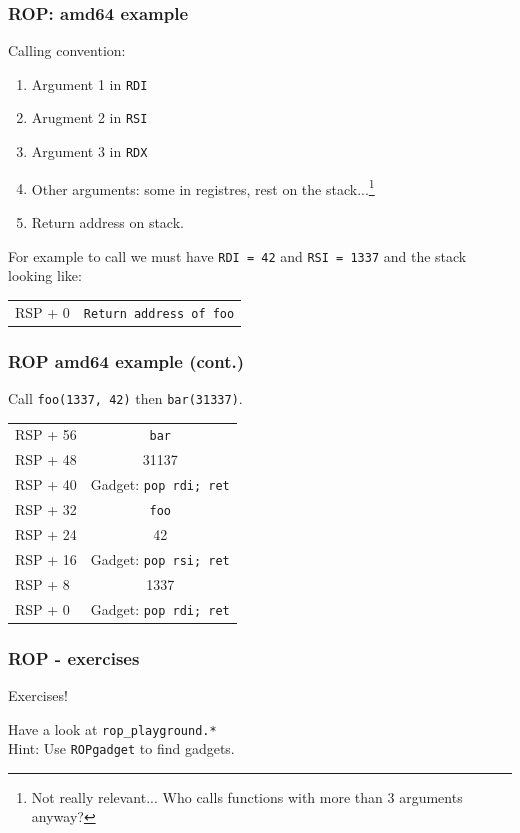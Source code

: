 \documentclass{beamer}
\begin{document}
\begin{frame}
    \frametitle{ROP: amd64 example}
    Calling convention:
    \begin{enumerate}
        \item Argument 1 in \texttt{RDI}
        \item Arugment 2 in \texttt{RSI}
        \item Argument 3 in \texttt{RDX}
        \item Other arguments: some in registres, rest on the stack...\footnote{Not really relevant... Who calls functions with more than 3 arguments anyway?}
        \item Return address on stack.
    \end{enumerate}
    \pause For example to call 
    \pause we must have \texttt{RDI = 42}
    \pause and \texttt{RSI = 1337}
    \pause and the stack looking like:
    \begin{center}
    \begin{tabular}{l|c}
        RSP + 0  & \texttt{Return address of foo}
    \end{tabular}
    \end{center}
\end{frame}


\begin{frame}
    \frametitle{ROP amd64 example (cont.)}
    Call \texttt{foo(1337, 42)} then \texttt{bar(31337)}.
    \begin{center}
    \begin{tabular}{l|c}
        RSP + 56 & \texttt{bar} \\
        RSP + 48 & 31137 \\
        RSP + 40 & Gadget: \texttt{pop rdi; ret} \\
        RSP + 32 & \texttt{foo} \\
        RSP + 24 & 42 \\
        RSP + 16 & Gadget: \texttt{pop rsi; ret} \\
        RSP + 8  & 1337 \\
        RSP + 0  & Gadget: \texttt{pop rdi; ret} \\
    \end{tabular}
    \end{center}
\end{frame}


\begin{frame}
    \frametitle{ROP - exercises}
    \begin{center}
        {\Huge Exercises!}
    \end{center}
    Have a look at \texttt{rop\_playground.*} \\
    Hint: Use \texttt{ROPgadget} to find gadgets.
\end{frame}
\end{document}
